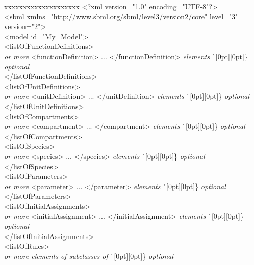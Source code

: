 \newcommand{\sayOptional}{\raisebox{0pt}[0pt][0pt]{\bigg\} \textrm{\emph{optional}}}}

\vspace*{2ex}
\begin{tt}
  \tightspacing
  \small
  \begin{tabbing}
xxxx\=xxxx\=xxxx\=xxxx\=xxxx\=\kill
\+\>
<?xml version="1.0" encoding="UTF-8"?>\\
<sbml xmlns="http://www.sbml.org/sbml/level3/version2/core" level="3" version="2">\\
\><model id="My\_Model">\\
\>\><listOfFunctionDefinitions>\\
\>\>\>\textrm{\emph{ or more}} <functionDefinition> ... </functionDefinition> \textrm{\emph{elements}}  \` \sayOptional\\
\>\></listOfFunctionDefinitions>\\
\>\><listOfUnitDefinitions>\\
\>\>\>\textrm{\emph{ or more}} <unitDefinition> ... </unitDefinition> \textrm{\emph{elements}}  \` \sayOptional\\
\>\></listOfUnitDefinitions>\\
\>\><listOfCompartments>\\
\>\>\>\textrm{\emph{ or more}} <compartment> ... </compartment> \textrm{\emph{elements}}  \` \sayOptional\\
\>\></listOfCompartments>\\
\>\><listOfSpecies>\\
\>\>\>\textrm{\emph{ or more}} <species> ... </species> \textrm{\emph{elements}}  \` \sayOptional\\
\>\></listOfSpecies>\\
\>\><listOfParameters>\\
\>\>\>\textrm{\emph{ or more}} <parameter> ... </parameter> \textrm{\emph{elements}}  \` \sayOptional\\
\>\></listOfParameters>\\
\>\><listOfInitialAssignments>\\
\>\>\>\textrm{\emph{ or more}} <initialAssignment> ... </initialAssignment> \textrm{\emph{elements}}  \` \sayOptional\\
\>\></listOfInitialAssignments>\\
\>\><listOfRules>\\
\>\>\>\textrm{\emph{ or more elements of subclasses of }}  \` \sayOptional\\

\end{tabbing}
\end{tt}
